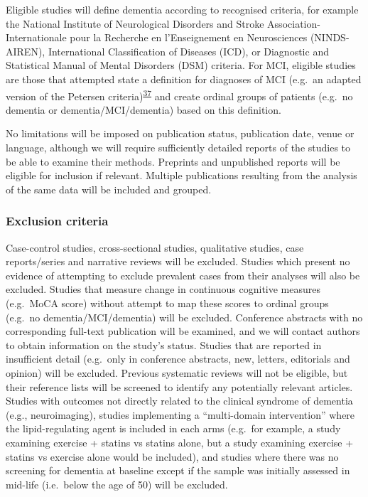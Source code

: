 \documentclass[a4paper, twoside]{templates/ociamthesis}
\begin{document}
Eligible studies will define dementia according to recognised criteria, for example the National Institute of Neurological Disorders and Stroke Association-Internationale pour la Recherche en l'Enseignement en Neurosciences (NINDS-AIREN), International Classification of Diseases (ICD), or Diagnostic and Statistical Manual of Mental Disorders (DSM) criteria. For MCI, eligible studies are those that attempted state a definition for diagnoses of MCI (e.g.~an adapted version of the Petersen criteria)\textsuperscript{\protect\hyperlink{ref-petersen1999}{37}} and create ordinal groups of patients (e.g.~no dementia or dementia/MCI/dementia) based on this definition.

No limitations will be imposed on publication status, publication date, venue or language, although we will require sufficiently detailed reports of the studies to be able to examine their methods. Preprints and unpublished reports will be eligible for inclusion if relevant. Multiple publications resulting from the analysis of the same data will be included and grouped.

\hypertarget{exclusion-criteria}{%
\subsubsection{Exclusion criteria}\label{exclusion-criteria}}

Case-control studies, cross-sectional studies, qualitative studies, case reports/series and narrative reviews will be excluded. Studies which present no evidence of attempting to exclude prevalent cases from their analyses will also be excluded. Studies that measure change in continuous cognitive measures (e.g.~MoCA score) without attempt to map these scores to ordinal groups (e.g.~no dementia/MCI/dementia) will be excluded. Conference abstracts with no corresponding full-text publication will be examined, and we will contact authors to obtain information on the study's status. Studies that are reported in insufficient detail (e.g.~only in conference abstracts, new, letters, editorials and opinion) will be excluded. Previous systematic reviews will not be eligible, but their reference lists will be screened to identify any potentially relevant articles. Studies with outcomes not directly related to the clinical syndrome of dementia (e.g., neuroimaging), studies implementing a ``multi-domain intervention'' where the lipid-regulating agent is included in each arms (e.g.~for example, a study examining exercise + statins vs statins alone, but a study examining exercise + statins vs exercise alone would be included), and studies where there was no screening for dementia at baseline except if the sample was initially assessed in mid-life (i.e.~below the age of 50) will be excluded.
\end{document}

